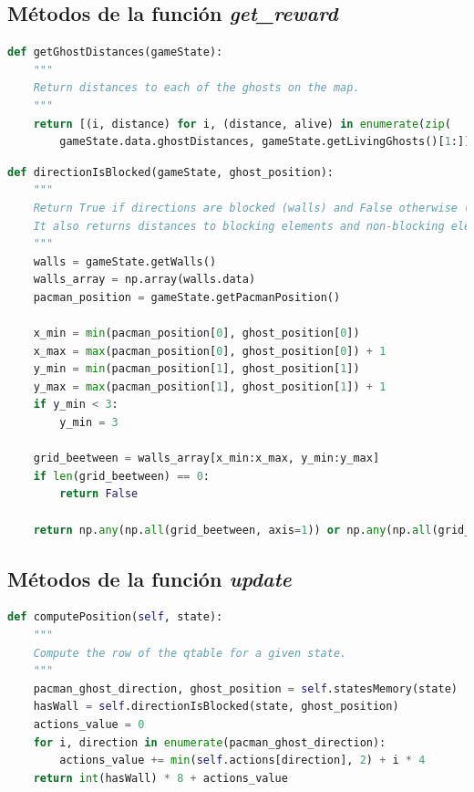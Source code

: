 \documentclass[11pt]{exam}
\begin{document}
\subsection{Métodos de la función \textit{get\_reward}}\label{apendice_reward}

\begin{lstlisting}[caption={Función getGhostDistances.}, label={getGhostDistances}, language=python, basicstyle=\footnotesize]
def getGhostDistances(gameState):
	"""
	Return distances to each of the ghosts on the map.
	"""
	return [(i, distance) for i, (distance, alive) in enumerate(zip(
		gameState.data.ghostDistances, gameState.getLivingGhosts()[1:])) if alive]
\end{lstlisting}

\begin{lstlisting}[caption={Función directionIsBlocked.}, label={directionIsBlocked}, language=python, basicstyle=\footnotesize]
def directionIsBlocked(gameState, ghost_position):
	"""
	Return True if directions are blocked (walls) and False otherwise (no walls).
	It also returns distances to blocking elements and non-blocking elements.
	"""
	walls = gameState.getWalls()
	walls_array = np.array(walls.data)
	pacman_position = gameState.getPacmanPosition()
	
	x_min = min(pacman_position[0], ghost_position[0])
	x_max = max(pacman_position[0], ghost_position[0]) + 1
	y_min = min(pacman_position[1], ghost_position[1])
	y_max = max(pacman_position[1], ghost_position[1]) + 1
	if y_min < 3:
		y_min = 3
	
	grid_beetween = walls_array[x_min:x_max, y_min:y_max]
	if len(grid_beetween) == 0:
		return False
	
	return np.any(np.all(grid_beetween, axis=1)) or np.any(np.all(grid_beetween, axis=0))
\end{lstlisting}

\newpage

\subsection{Métodos de la función \textit{update}}\label{apendice_update}

\begin{lstlisting}[caption={Función computePosition.}, label={computePosition}, language=python, basicstyle=\footnotesize]
def computePosition(self, state):
	"""
	Compute the row of the qtable for a given state.
	"""
	pacman_ghost_direction, ghost_position = self.statesMemory(state)
	hasWall = self.directionIsBlocked(state, ghost_position)
	actions_value = 0
	for i, direction in enumerate(pacman_ghost_direction):
		actions_value += min(self.actions[direction], 2) + i * 4
	return int(hasWall) * 8 + actions_value
\end{lstlisting}
\end{document}
